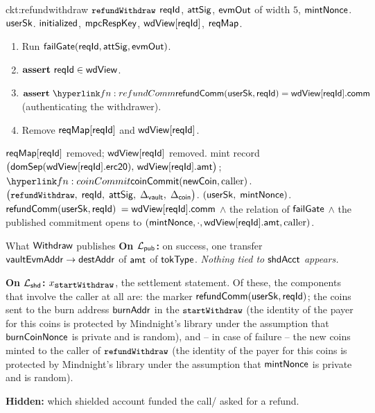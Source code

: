 \begin{CktBox}{ckt:refundwithdraw}{ $\texttt{\small refundWithdraw}$}
 $\mathsf{reqId}$, $\mathsf{attSig}$, $\mathsf{evmOut}$ of width $5$, $\mathsf{mintNonce}$.
 $\mathsf{userSk}$.
 $\mathsf{initialized}$, $\mathsf{mpcRespKey}$, $\mathsf{wdView}[\mathsf{reqId}]$, $\mathsf{reqMap}$.
\begin{enumerate}[nosep,leftmargin=1.7em,topsep=2pt]
\item Run $\mathsf{failGate}(\mathsf{reqId}, \mathsf{attSig}, \mathsf{evmOut})$.
\item $\textbf{assert}~ \mathsf{reqId} \in \mathsf{wdView}$.
\item $\assert \lnk{fn:refundComm}{\refundComm(\usersk, \rid)} = \wdView[\rid].\fComm$ (authenticating the withdrawer).
\item Remove $\mathsf{reqMap}[\mathsf{reqId}]$ and $\mathsf{wdView}[\mathsf{reqId}]$.
\end{enumerate}
\begin{OutList}
\oitem{\Dvault} $\mathsf{reqMap}[\mathsf{reqId}]$ removed; $\mathsf{wdView}[\mathsf{reqId}]$ removed.
\oitem{\Dshd} \bluedot mint record
  $\bigl(\mathsf{domSep}(\mathsf{wdView}[\mathsf{reqId}].\mathsf{erc20}),\, \mathsf{wdView}[\mathsf{reqId}].\mathsf{amt}\bigr)$; \;
  \bluedot $\lnk{fn:coinCommit}{\coinCommit(\coinMint, \text{caller})}$.
\oitem{\stmt} $\bigl(\texttt{\small refundWithdraw},\; \mathsf{reqId},\; \mathsf{attSig},\; \Delta_{\mathsf{vault}},\; \Delta_{\mathsf{coin}}\bigr)$.
\oitem{\wit} $(\mathsf{userSk},\; \mathsf{mintNonce})$.
\oitem{\Rel} $\mathsf{refundComm}(\mathsf{userSk}, \mathsf{reqId})$ $= \mathsf{wdView}[\mathsf{reqId}].\mathsf{comm}$ \;$\wedge$\; the relation of
  $\mathsf{failGate}$ \;$\wedge$\; the published commitment opens to
  $(\mathsf{mintNonce}, \cdot, \mathsf{wdView}[\mathsf{reqId}].\mathsf{amt}, \text{caller})$.
\end{OutList}
\end{CktBox}


\begin{PubBox}{What $\mathsf{Withdraw}$ publishes}
\textbf{On $\mathcal{L}_{\mathsf{pub}}$:} on success, one transfer $\mathsf{vaultEvmAddr} \to \mathsf{destAddr}$ of $\mathsf{amt}$ of $\mathsf{tokType}$.
\emph{Nothing tied to $\mathsf{shdAcct}$ appears.}

\smallskip
\textbf{On $\mathcal{L}_{\mathsf{shd}}$:} $x_{\texttt{\small startWithdraw}}$, the settlement
statement. Of these, the components that involve the caller at all are: the marker
$\mathsf{refundComm}(\mathsf{userSk}, \mathsf{reqId})$;  the coins sent to the burn address $\mathsf{burnAddr}$ in the $\texttt{\small startWithdraw}$ (the identity of the payer for this coins is protected by Mindnight's library under the assumption that $\mathsf{burnCoinNonce}$ is private and is random), and -- in case of failure -- the new coins minted to the caller of $\texttt{\small refundWithdraw}$ (the identity of the payer for this coins is protected by Mindnight's library under the assumption that $\mathsf{mintNonce}$ is private and is random).


\smallskip
\textbf{Hidden:} which shielded account funded the call/ asked for a refund.
\end{PubBox}



